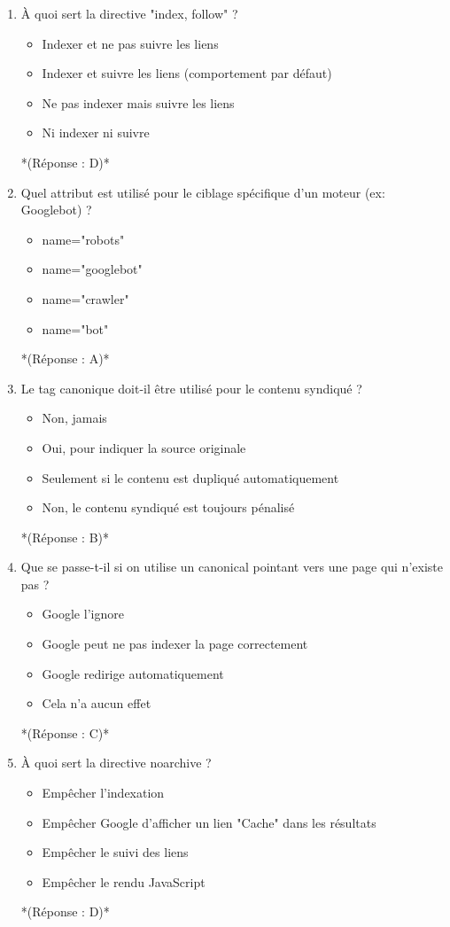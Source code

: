 \documentclass[12pt,a4paper,twoside]{report}
\begin{document}
\begin{enumerate}
\item À quoi sert la directive "index, follow" ?
\begin{itemize}
\item[A)] Indexer et ne pas suivre les liens
\item[B)] Indexer et suivre les liens (comportement par défaut)
\item[C)] Ne pas indexer mais suivre les liens
\item[D)] Ni indexer ni suivre
\end{itemize}
*(Réponse : D)*

\item Quel attribut est utilisé pour le ciblage spécifique d'un moteur (ex: Googlebot) ?
\begin{itemize}
\item[A)] name="robots"
\item[B)] name="googlebot"
\item[C)] name="crawler"
\item[D)] name="bot"
\end{itemize}
*(Réponse : A)*

\item Le tag canonique doit-il être utilisé pour le contenu syndiqué ?
\begin{itemize}
\item[A)] Non, jamais
\item[B)] Oui, pour indiquer la source originale
\item[C)] Seulement si le contenu est dupliqué automatiquement
\item[D)] Non, le contenu syndiqué est toujours pénalisé
\end{itemize}
*(Réponse : B)*

\item Que se passe-t-il si on utilise un canonical pointant vers une page qui n'existe pas ?
\begin{itemize}
\item[A)] Google l'ignore
\item[B)] Google peut ne pas indexer la page correctement
\item[C)] Google redirige automatiquement
\item[D)] Cela n'a aucun effet
\end{itemize}
*(Réponse : C)*

\item À quoi sert la directive noarchive ?
\begin{itemize}
\item[A)] Empêcher l'indexation
\item[B)] Empêcher Google d'afficher un lien "Cache" dans les résultats
\item[C)] Empêcher le suivi des liens
\item[D)] Empêcher le rendu JavaScript
\end{itemize}
*(Réponse : D)*


\end{enumerate}
\end{document}
